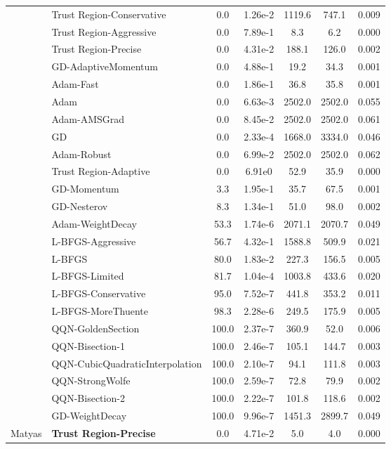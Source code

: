 \documentclass{article}
\begin{document}
\begin{table}[htbp]
{\begin{tabular}{p{2.5cm}p{2.5cm}*{5}{c}}
 & Trust Region-Conservative & 0.0 & 1.26e-2 & 1119.6 & 747.1 & 0.009 \\
 & Trust Region-Aggressive & 0.0 & 7.89e-1 & 8.3 & 6.2 & 0.000 \\
 & Trust Region-Precise & 0.0 & 4.31e-2 & 188.1 & 126.0 & 0.002 \\
 & GD-AdaptiveMomentum & 0.0 & 4.88e-1 & 19.2 & 34.3 & 0.001 \\
 & Adam-Fast & 0.0 & 1.86e-1 & 36.8 & 35.8 & 0.001 \\
 & Adam & 0.0 & 6.63e-3 & 2502.0 & 2502.0 & 0.055 \\
 & Adam-AMSGrad & 0.0 & 8.45e-2 & 2502.0 & 2502.0 & 0.061 \\
 & GD & 0.0 & 2.33e-4 & 1668.0 & 3334.0 & 0.046 \\
 & Adam-Robust & 0.0 & 6.99e-2 & 2502.0 & 2502.0 & 0.062 \\
 & Trust Region-Adaptive & 0.0 & 6.91e0 & 52.9 & 35.9 & 0.000 \\
 & GD-Momentum & 3.3 & 1.95e-1 & 35.7 & 67.5 & 0.001 \\
 & GD-Nesterov & 8.3 & 1.34e-1 & 51.0 & 98.0 & 0.002 \\
 & Adam-WeightDecay & 53.3 & 1.74e-6 & 2071.1 & 2070.7 & 0.049 \\
 & L-BFGS-Aggressive & 56.7 & 4.32e-1 & 1588.8 & 509.9 & 0.021 \\
 & L-BFGS & 80.0 & 1.83e-2 & 227.3 & 156.5 & 0.005 \\
 & L-BFGS-Limited & 81.7 & 1.04e-4 & 1003.8 & 433.6 & 0.020 \\
 & L-BFGS-Conservative & 95.0 & 7.52e-7 & 441.8 & 353.2 & 0.011 \\
 & L-BFGS-MoreThuente & 98.3 & 2.28e-6 & 249.5 & 175.9 & 0.005 \\
 & QQN-GoldenSection & 100.0 & 2.37e-7 & 360.9 & 52.0 & 0.006 \\
 & QQN-Bisection-1 & 100.0 & 2.46e-7 & 105.1 & 144.7 & 0.003 \\
 & QQN-CubicQuadraticInterpolation & 100.0 & 2.10e-7 & 94.1 & 111.8 & 0.003 \\
 & QQN-StrongWolfe & 100.0 & 2.59e-7 & 72.8 & 79.9 & 0.002 \\
 & QQN-Bisection-2 & 100.0 & 2.22e-7 & 101.8 & 118.6 & 0.002 \\
 & GD-WeightDecay & 100.0 & 9.96e-7 & 1451.3 & 2899.7 & 0.049 \\
\midrule
\multirow{25}{*}{Matyas} & \textbf{Trust Region-Precise} & 0.0 & 4.71e-2 & 5.0 & 4.0 & 0.000 \\

\end{tabular}}
\end{table}
\end{document}
